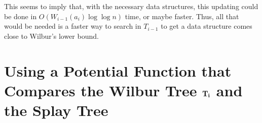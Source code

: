 \documentclass[charterfonts,lotsofwhite]{patmorin}
\begin{document}
This seems to imply that, with the necessary data structures, this
updating could be done in $O(W_{i-1}(a_i)\log\log n)$ time, or maybe
faster.  Thus, all that would be needed is a faster way to search in
$T_{i-1}$ to get a data structure comes close to Wilbur's lower bound.

\section{Using a Potential Function that Compares the Wilbur Tree
$\bf T_i$ and the Splay Tree}
\end{document}
